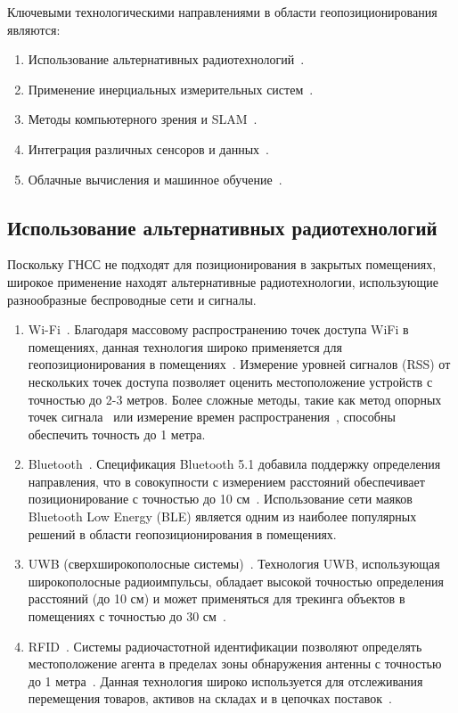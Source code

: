 Ключевыми технологическими направлениями в области геопозиционирования являются:

\begin{enumerate}
    \item Использование альтернативных радиотехнологий~\cite{altradio}.
    \item Применение инерциальных измерительных систем~\cite{inertialsys}.
    \item Методы компьютерного зрения и SLAM~\cite{compvision}.
    \item Интеграция различных сенсоров и данных~\cite{multsensors}.
    \item Облачные вычисления и машинное обучение~\cite{cloudML}.
\end{enumerate}

\subsection{Использование альтернативных радиотехнологий}

Поскольку ГНСС не подходят для позиционирования в закрытых помещениях, широкое применение находят альтернативные радиотехнологии, использующие разнообразные беспроводные сети и сигналы.

\begin{enumerate}
    \item Wi-Fi~\cite{wifi}. Благодаря массовому распространению точек доступа WiFi в помещениях, данная технология широко применяется для геопозиционирования в помещениях~\cite{trends}. Измерение уровней сигналов (RSS) от нескольких точек доступа позволяет оценить местоположение устройств с точностью до 2-3 метров. Более сложные методы, такие как метод опорных точек сигнала~\cite{fingerprint} или измерение времен распространения~\cite{toa}, способны обеспечить точность до 1 метра.
    \item Bluetooth~\cite{bluetooth}. Спецификация Bluetooth 5.1 добавила поддержку определения направления, что в совокупности с измерением расстояний обеспечивает позиционирование с точностью до 10 см~\cite{basebook}. Использование сети маяков Bluetooth Low Energy (BLE) является одним из наиболее популярных решений в области геопозиционирования в помещениях.
    \item UWB (сверхширокополосные системы)~\cite{uwb}. Технология UWB, использующая широкополосные радиоимпульсы, обладает высокой точностью определения расстояний (до 10 см) и может применяться для трекинга объектов в помещениях с точностью до 30 см~\cite{uwbaccuracy}.
    \item RFID~\cite{rfid}. Системы радиочастотной идентификации позволяют определять местоположение агента в пределах зоны обнаружения антенны с точностью до 1 метра~\cite{basebook}. Данная технология широко используется для отслеживания перемещения товаров, активов на складах и в цепочках поставок~\cite{shielding}.
\end{enumerate}


